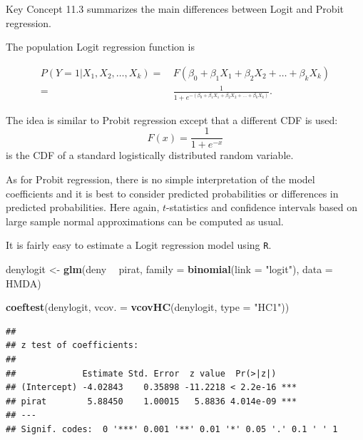 \documentclass[]{book}
\newenvironment{Shaded}{\begin{snugshade}}{\end{snugshade}}
\newcommand{\KeywordTok}[1]{\textcolor[rgb]{0.13,0.29,0.53}{\textbf{#1}}}
\newcommand{\DataTypeTok}[1]{\textcolor[rgb]{0.13,0.29,0.53}{#1}}
\newcommand{\StringTok}[1]{\textcolor[rgb]{0.31,0.60,0.02}{#1}}
\newcommand{\OperatorTok}[1]{\textcolor[rgb]{0.81,0.36,0.00}{\textbf{#1}}}
\newcommand{\NormalTok}[1]{#1}
\theoremstyle{definition}
\theoremstyle{definition}
\theoremstyle{definition}
\theoremstyle{remark}
\begin{document}
Key Concept 11.3 summarizes the main differences between Logit and
Probit regression.

\begin{keyconcepts}{11.3}
The population Logit regression function is

\begin{align*}
  P(Y=1\vert X_1, X_2, \dots, X_k) =& \, F(\beta_0 + \beta_1 X_1 + \beta_2 X_2 + \dots + \beta_k X_k) \\
  =& \, \frac{1}{1+e^{-(\beta_0 + \beta_1 X_1 + \beta_2 X_2 + \dots + \beta_k X_k)}}.
\end{align*}

The idea is similar to Probit regression except that a different CDF is used: $$F(x) = \frac{1}{1+e^{-x}}$$ is the CDF of a standard logistically distributed random variable.
\end{keyconcepts}

As for Probit regression, there is no simple interpretation of the model
coefficients and it is best to consider predicted probabilities or
differences in predicted probabilities. Here again, \(t\)-statistics and
confidence intervals based on large sample normal approximations can be
computed as usual.

It is fairly easy to estimate a Logit regression model using \texttt{R}.

\begin{Shaded}
\begin{Highlighting}[]
\NormalTok{denylogit <-}\StringTok{ }\KeywordTok{glm}\NormalTok{(deny }\OperatorTok{~}\StringTok{ }\NormalTok{pirat, }
                \DataTypeTok{family =} \KeywordTok{binomial}\NormalTok{(}\DataTypeTok{link =} \StringTok{"logit"}\NormalTok{), }
                \DataTypeTok{data =}\NormalTok{ HMDA)}

\KeywordTok{coeftest}\NormalTok{(denylogit, }\DataTypeTok{vcov. =} \KeywordTok{vcovHC}\NormalTok{(denylogit, }\DataTypeTok{type =} \StringTok{"HC1"}\NormalTok{))}
\end{Highlighting}
\end{Shaded}

\begin{verbatim}
## 
## z test of coefficients:
## 
##             Estimate Std. Error  z value  Pr(>|z|)    
## (Intercept) -4.02843    0.35898 -11.2218 < 2.2e-16 ***
## pirat        5.88450    1.00015   5.8836 4.014e-09 ***
## ---
## Signif. codes:  0 '***' 0.001 '**' 0.01 '*' 0.05 '.' 0.1 ' ' 1
\end{verbatim}
\end{document}
